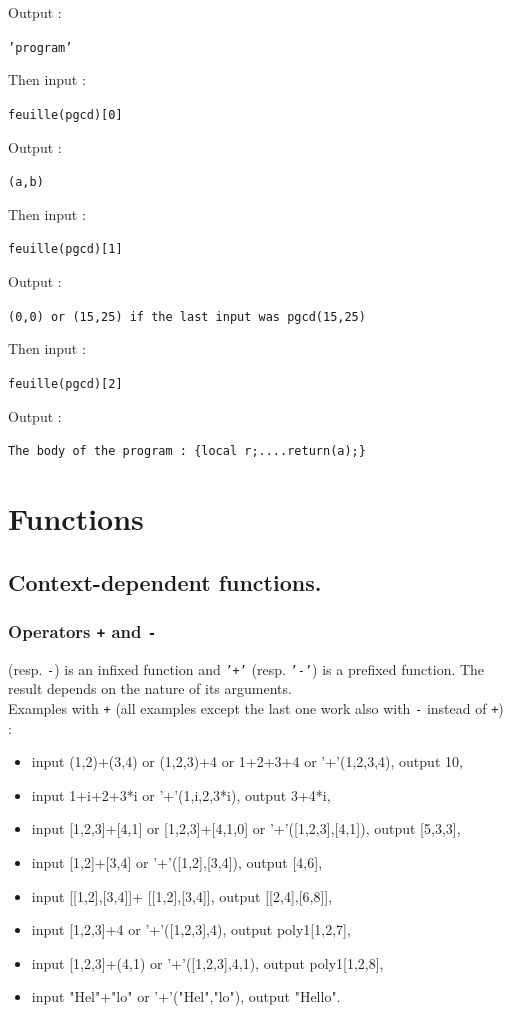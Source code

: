 \documentclass[a4paper,11pt]{book}
\begin{document}
Output :
\begin{center}{\tt 'program'}\end{center}  
Then input :
\begin{center}{\tt feuille(pgcd)[0]}\end{center} 
Output :
\begin{center}{\tt (a,b)}\end{center}
Then input :
\begin{center}{\tt feuille(pgcd)[1]}\end{center} 
Output :
\begin{center}{\tt (0,0) or (15,25) if the last input was pgcd(15,25)}\end{center}
Then input :
\begin{center}{\tt feuille(pgcd)[2]}\end{center} 
Output :
\begin{center}{\tt The body of the program : \{local r;....return(a);\}}\end{center}


\section{Functions}
\subsection{Context-dependent functions.}
\subsubsection{Operators {\tt +} and {\tt -}}\index{+}\index{-}
 \noindent{\tt +} (resp. {\tt -}) is an infixed function and {\tt '+'} (resp. 
{\tt '-'}) is a prefixed function. The result depends on the nature of its 
arguments.\\
Examples with {\tt +} (all examples except the last one work also 
with {\tt -} instead of {\tt +}) :
\begin{itemize}
\item input (1,2)+(3,4) or (1,2,3)+4 or 1+2+3+4 or '+'(1,2,3,4), output 10,
\item input  1+i+2+3*i or '+'(1,i,2,3*i), output 3+4*i,
\item input  [1,2,3]+[4,1] or [1,2,3]+[4,1,0] or '+'([1,2,3],[4,1]), output 
[5,3,3],
\item  input [1,2]+[3,4] or '+'([1,2],[3,4]), output [4,6], 
\item  input [[1,2],[3,4]]+ [[1,2],[3,4]], output [[2,4],[6,8]],
\item input  [1,2,3]+4 or '+'([1,2,3],4), output poly1[1,2,7],
\item input  [1,2,3]+(4,1) or '+'([1,2,3],4,1), output poly1[1,2,8],
\item  input "Hel"+"lo" or  '+'("Hel","lo"), output "Hello".
\end{itemize}
\end{document}
